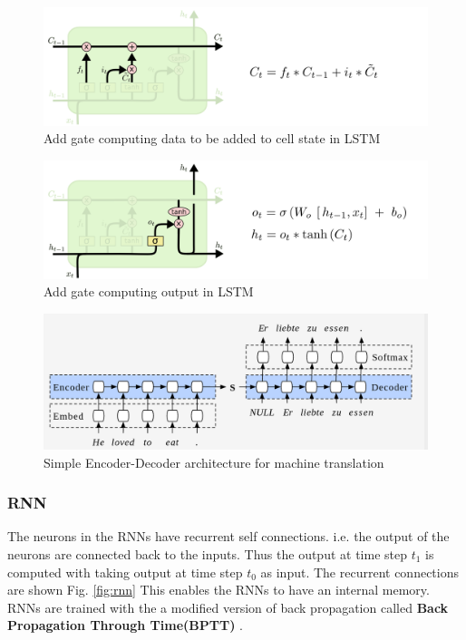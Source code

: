 \documentclass[a4paper]{article}
\begin{document}
\begin{figure}
  \includegraphics[width=.99\linewidth]{img/lstm_add1.png}
  \caption{Add gate computing data to be added to cell state in LSTM}
  \label{fig:lstm_add1}
\end{figure}


\begin{figure}
  \includegraphics[width=.99\linewidth]{img/lstm_output.png}
  \caption{Add gate computing output in LSTM}
  \label{fig:lstm_output}
\end{figure}


\begin{figure}
  \includegraphics[width=.99\linewidth]{img/enc_dec.png}
  \caption{Simple Encoder-Decoder architecture for machine translation}
  \label{fig:enc_dec}
\end{figure}


\subsubsection{RNN}

The neurons  in the RNNs have recurrent self connections. i.e. the output of the
neurons  are connected back to the inputs. Thus the output at time step $t_1$ is
computed  with taking  output  at  time  step  $t_0$  as  input.  The  recurrent
connections  are  shown  Fig. \ref{fig:rnn}  This  enables  the RNNs to have  an
internal  memory.  RNNs  are  trained  with  the  a  modified  version  of  back
propagation     called    \textbf{Back    Propagation     Through    Time(BPTT)}
\cite{werbos1990backpropagation}.
\end{document}

